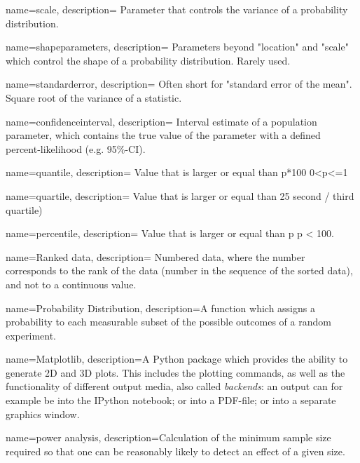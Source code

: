 {
    name=scale,
    description={ Parameter that controls the variance of a probability
    distribution.}
}

{
    name=shapeparameters,
    description={ Parameters beyond "location" and "scale" which control the shape of a
    probability distribution. Rarely used.}
}

{
    name=standarderror,
    description={ Often short for "standard error of the mean". Square root of the variance
    of a statistic.}
}

{
    name=confidenceinterval,
    description={ Interval estimate of a population parameter, which contains the true value
    of the parameter with a defined percent-likelihood (e.g. 95\%-CI).}
}

{
    name=quantile,
    description={ Value that is larger or equal than p*100%
    0<p<=1}
}

{
    name=quartile,
    description={ Value that is larger or equal than 25%
    second / third quartile)}
}

{
    name=percentile,
    description={ Value that is larger or equal than p%
    p < 100.}
}

{
    name=Ranked data,
    description={ Numbered data, where the number corresponds to the rank of the data
    (number in the sequence of the sorted data), and not to a
    continuous value.}
}


{
        name=Probability Distribution,
        description={A function which assigns a probability to each measurable subset of the possible outcomes of a random experiment.}
}

{
        name=Matplotlib,
        description={A Python package which provides the ability to generate 2D and 3D plots. This includes the plotting commands, as well as the functionality of different output media, also called \emph{backends}: an output can for example be into the IPython notebook; or into a PDF-file; or into a separate graphics window.}
}

{
        name=power analysis,
        description={Calculation of the minimum sample size required so that one can be reasonably likely to detect an effect of a given size.}
}

